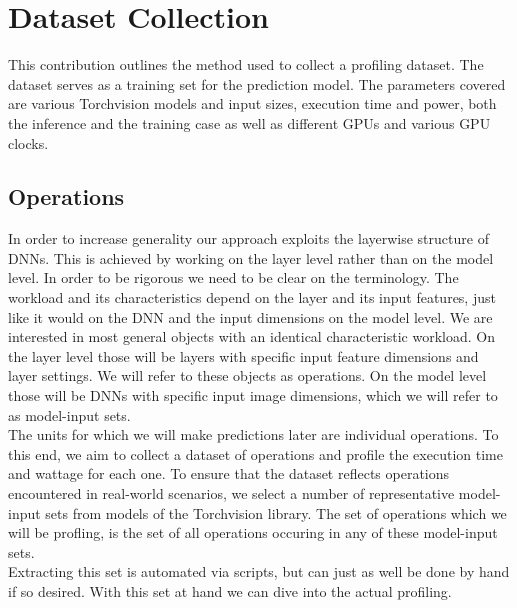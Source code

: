 \chapter{Dataset Collection}\label{chap:contrib1}


This contribution outlines the method used to collect a profiling dataset. The  dataset serves as a training set for the prediction model. The parameters covered are various Torchvision models and input sizes, execution time and power, both the inference and the training case as well as different GPUs and various GPU clocks.


\section{Operations}


In order to increase generality our approach exploits the layerwise structure of DNNs. This is achieved by working on the layer level rather than on the model level. In order to be rigorous we need to be clear on the terminology. The workload and its characteristics depend on the layer and its input features, just like it would on the DNN and the input dimensions on the model level. We are interested in most general objects with an identical characteristic workload. On the layer level those will be layers with specific input feature dimensions and layer settings. We will refer to these objects as operations. On the model level those will be DNNs with specific input image dimensions, which we will refer to as model-input sets. \\
The units for which we will make predictions later are individual operations. To this end, we aim to collect a dataset of operations and profile the execution time and wattage for each one. To ensure that the dataset reflects operations encountered in real-world scenarios, we select a number of representative model-input sets from models of the Torchvision library. The set of operations which we will be profling, is the set of all operations occuring in any of these model-input sets. \\
Extracting this set is automated via scripts, but can just as well be done by hand if so desired. With this set at hand we can dive into the actual profiling.



